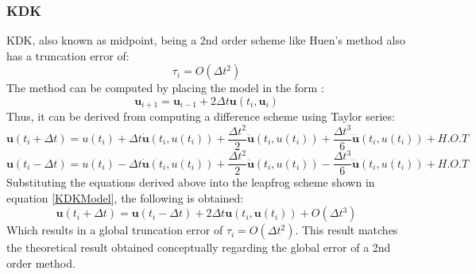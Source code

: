\documentclass[conf]{new-aiaa}
\begin{document}
    \subsubsection{KDK}
    KDK, also known as midpoint, being a 2nd order scheme like Huen's method also has a truncation error of:
    \begin{equation}
        \tau_i= O(\Delta t^2)
    \end{equation}
    The method can be computed by placing the model in the form \cite{TruncErrLF}:
    \begin{equation}
        \bm{u}_{i+1} = \bm{u}_{i-1} + 2\Delta t \bm{u}(t_i,\bm{u}_i) \label{KDKModel}
    \end{equation}
    Thus, it can be derived from computing a difference scheme using Taylor series\cite{TruncErrLF}:
    \begin{equation}
        \bm{u}(t_i + \Delta t) = u(t_i) + \Delta t \bm{\dot{u}}(t_i,u(t_i)) + \frac{\Delta t^2}{2}\bm{\ddot{u}}(t_i,u(t_i)) + \frac{\Delta t^3}{6}\bm{\dddot{u}}(t_i,u(t_i)) + H.O.T
    \end{equation}
    \begin{equation}
        \bm{u}(t_i - \Delta t) = u(t_i) - \Delta t \bm{\dot{u}}(t_i,u(t_i)) + \frac{\Delta t^2}{2}\bm{\ddot{u}}(t_i,u(t_i)) - \frac{\Delta t^3}{6}\bm{\dddot{u}}(t_i,u(t_i)) + H.O.T
    \end{equation}
    Substituting the equations derived above into the leapfrog scheme shown in equation \eqref{KDKModel}, the following is obtained\cite{TruncErrLF}:
    \begin{equation}
        \bm{u}(t_i + \Delta t) = \bm{u}(t_i - \Delta t) + 2\Delta t \bm{u}(t_i,\bm{u}(t_i)) + O(\Delta t^3)
    \end{equation}
    Which results in a global truncation error of $\tau_i = O(\Delta t^2)$. This result matches the theoretical result obtained conceptually regarding the global error of a 2nd order method.
    
\end{document}
